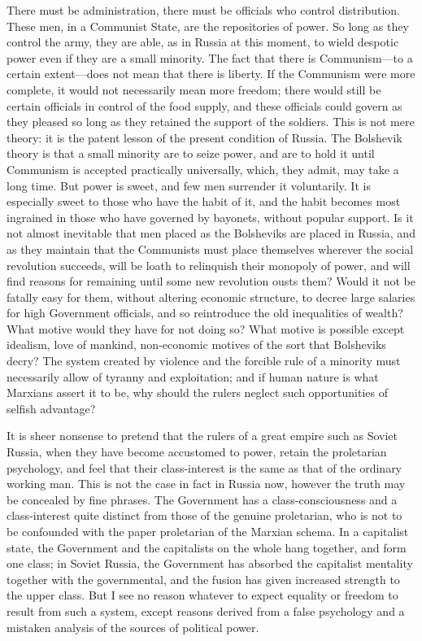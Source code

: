 There must be administration, there must be officials who control distribution. These men, in a Communist State, are the repositories of power. So long as they control the army, they are able, as in Russia at this moment, to wield despotic power even if they are a small minority. The fact that there is Communism---to a certain extent---does not mean that there is liberty. If the Communism were more complete, it would not necessarily mean more freedom; there would still be certain officials in control of the food supply, and these officials could govern as they pleased so long as they retained the support of the soldiers. This is not mere theory: it is the patent lesson of the present condition of Russia. The Bolshevik theory is that a small minority are to seize power, and are to hold it until Communism is accepted practically universally, which, they admit, may take a long time. But power is sweet, and few men surrender it voluntarily. It is especially sweet to those who have the habit of it, and the habit becomes most ingrained in those who have governed by bayonets, without popular support. Is it not almost inevitable that men placed as the Bolsheviks are placed in Russia, and as they maintain that the Communists must place themselves wherever the social revolution succeeds, will be loath to relinquish their monopoly of power, and will find reasons for remaining until some new revolution ousts them? Would it not be fatally easy for them, without altering economic structure, to decree large salaries for high Government officials, and so reintroduce the old inequalities of wealth? What motive would they have for not doing so? What motive is possible except idealism, love of mankind, non-economic motives of the sort that Bolsheviks decry? The system created by violence and the forcible rule of a minority must necessarily allow of tyranny and exploitation; and if human nature is what Marxians assert it to be, why should the rulers neglect such opportunities of selfish advantage?

It is sheer nonsense to pretend that the rulers of a great empire such as Soviet Russia, when they have become accustomed to power, retain the proletarian psychology, and feel that their class-interest is the same as that of the ordinary working man. This is not the case in fact in Russia now, however the truth may be concealed by fine phrases. The Government has a class-consciousness and a class-interest quite distinct from those of the genuine proletarian, who is not to be confounded with the paper proletarian of the Marxian schema. In a capitalist state, the Government and the capitalists on the whole hang together, and form one class; in Soviet Russia, the Government has absorbed the capitalist mentality together with the governmental, and the fusion has given increased strength to the upper class. But I see no reason whatever to expect equality or freedom to result from such a system, except reasons derived from a false psychology and a mistaken analysis of the sources of political power.

